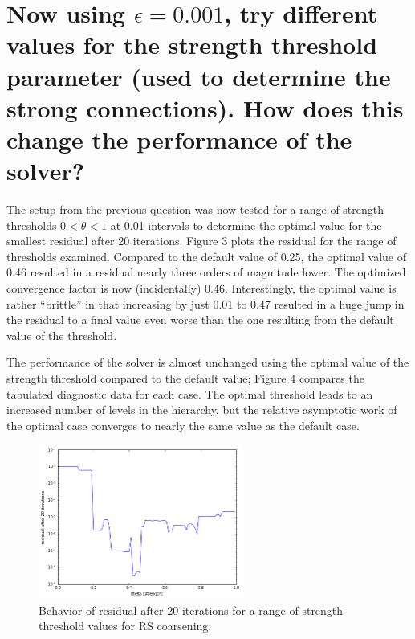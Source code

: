 \documentclass[letterpaper,10pt]{article}
\begin{document}
\clearpage 

\section*{Now using $\epsilon=0.001$, try different values for the strength threshold parameter (used to determine the strong connections). How does this change the performance of the solver?}

The setup from the previous question was now tested for a range of strength thresholds $0<\theta<1$ at 0.01 intervals to determine the optimal value for the smallest residual after 20 iterations. Figure 3 plots the residual for the range of thresholds examined. Compared to the default value of 0.25, the optimal value of 0.46 resulted in a residual nearly three orders of magnitude lower. The optimized convergence factor is now (incidentally) 0.46. Interestingly, the optimal value is rather ``brittle'' in that increasing by just 0.01 to 0.47 resulted in a huge jump in the residual to a final value even worse than the one resulting from the default value of the threshold.

The performance of the solver is almost unchanged using the optimal value of the strength threshold compared to the default value; Figure 4 compares the tabulated diagnostic data for each case. The optimal threshold leads to an increased number of levels in the hierarchy, but the relative asymptotic work of the optimal case converges to nearly the same value as the default case.
\begin{figure}[!htb]
\centering
\includegraphics[width=0.6\textwidth]{RS.PNG}
\caption{Behavior of residual after 20 iterations for a range of strength threshold values for RS coarsening.}
\end{figure}
\end{document}
